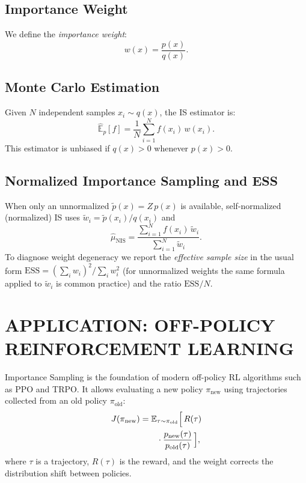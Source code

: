 \documentclass[10pt,a4paper,conference]{IEEEtran}
\begin{document}
\subsection{Importance Weight}
We define the \emph{importance weight}:
\[
w(x) = \frac{p(x)}{q(x)}.
\]

\subsection{Monte Carlo Estimation}
Given \(N\) independent samples \(x_i \sim q(x)\), the IS estimator is:
\begin{equation}
\hat{\mathbb{E}}_{p}[f] = \frac{1}{N}\sum_{i=1}^{N} f(x_i)\,w(x_i).
\end{equation}
This estimator is unbiased if \(q(x) > 0\) whenever \(p(x) > 0\).

\subsection{Normalized Importance Sampling and ESS}
When only an unnormalized \(\tilde{p}(x)=Z\,p(x)\) is available, self-normalized (normalized) IS uses \(\tilde{w}_i=\tilde{p}(x_i)/q(x_i)\) and
\begin{equation}
\hat{\mu}_{\mathrm{NIS}}=\frac{\displaystyle\sum_{i=1}^{N} f(x_i)\,\tilde{w}_i}{\displaystyle\sum_{i=1}^{N} \tilde{w}_i}.
\end{equation}
To diagnose weight degeneracy we report the \emph{effective sample size} in the usual form \(\mathrm{ESS}=(\sum_i w_i)^2/\sum_i w_i^2\) (for unnormalized weights the same formula applied to \(\tilde{w}_i\) is common practice) and the ratio \(\mathrm{ESS}/N\).

\section{APPLICATION: OFF-POLICY REINFORCEMENT LEARNING}
Importance Sampling is the foundation of modern off-policy RL algorithms such as PPO and TRPO. It allows evaluating a new policy \(\pi_{\text{new}}\) using trajectories collected from an old policy \(\pi_{\text{old}}\):
\begin{equation}
\begin{aligned}
J(\pi_{\text{new}}) &= \mathbb{E}_{\tau\sim\pi_{\text{old}}}\Bigl[\,R(\tau) \\
&\qquad {}\cdot \frac{p_{\text{new}}(\tau)}{p_{\text{old}}(\tau)}\,\Bigr],
\end{aligned}
\end{equation}
where \(\tau\) is a trajectory, \(R(\tau)\) is the reward, and the weight corrects the distribution shift between policies.
\end{document}
